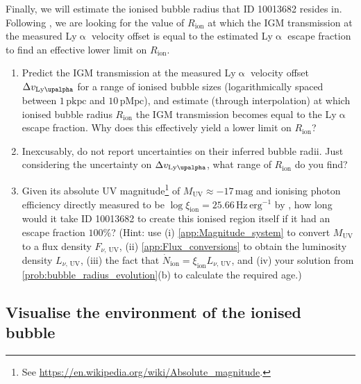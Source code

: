 \documentclass{article}
\newcommand{\Lya}{{Ly\ensuremath{\upalpha}}\xspace}
\theoremstyle{definition}
\begin{document}
Finally, we will estimate the ionised bubble radius that ID 10013682 resides in. Following \citet{2024A&A...682A..40W}, we are looking for the value of $R_\text{ion}$ at which the IGM transmission at the measured \Lya velocity offset is equal to the estimated \Lya escape fraction to find an effective lower limit on $R_\text{ion}$.
\begin{enumerate}[label=(\alph*)]
    \item Predict the IGM transmission at the measured \Lya velocity offset $\Delta v_\text{\Lya}$ for a range of ionised bubble sizes (logarithmically spaced between $1 \, \mathrm{pkpc}$ and $10 \, \mathrm{pMpc}$), and estimate (through interpolation) at which ionised bubble radius $R_\text{ion}$ the IGM transmission becomes equal to the \Lya escape fraction. Why does this effectively yield a lower limit on $R_\text{ion}$?
    \item Inexcusably, \citet{2024A&A...682A..40W} do not report uncertainties on their inferred bubble radii. Just considering the uncertainty on $\Delta v_\text{\Lya}$, what range of $R_\text{ion}$ do you find?
    \item Given its absolute UV magnitude\footnote{See \url{https://en.wikipedia.org/wiki/Absolute_magnitude}.} of $M_\text{UV} \approx -17 \, \mathrm{mag}$ and ionising photon efficiency directly measured to be $\log \xi_\text{ion} = 25.66 \, \mathrm{Hz \, erg^{-1}}$ by \citet{2024A&A...684A..84S}, how long would it take ID 10013682 to create this ionised region itself if it had an escape fraction $100\%$? (Hint: use (i) \cref{app:Magnitude_system} to convert $M_\text{UV}$ to a flux density $F_{\nu, \, \text{UV}}$, (ii) \cref{app:Flux_conversions} to obtain the luminosity density $L_{\nu, \, \text{UV}}$, (iii) the fact that $\dot{N}_\text{ion} = \xi_\text{ion} L_{\nu, \, \text{UV}}$, and (iv) your solution from \cref{prob:bubble_radius_evolution}(b) to calculate the required age.)
\end{enumerate}

\subsection{Visualise the environment of the ionised bubble}
\end{document}

